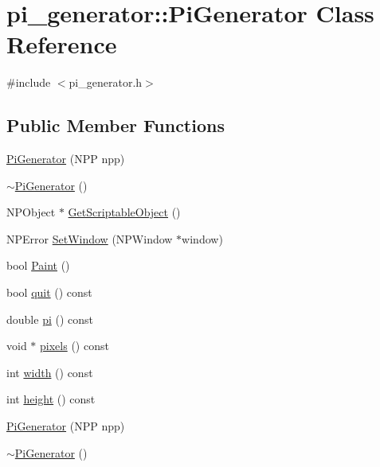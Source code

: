 \hypertarget{classpi__generator_1_1_pi_generator}{
\section{pi\_\-generator::PiGenerator Class Reference}
\label{classpi__generator_1_1_pi_generator}
}


{\ttfamily \#include $<$pi\_\-generator.h$>$}

\subsection*{Public Member Functions}
\begin{DoxyCompactItemize}
\item 
\hyperlink{classpi__generator_1_1_pi_generator_a0f5a55bbb942dee1b185447f0a7e24be}{PiGenerator} (NPP npp)
\item 
\hyperlink{classpi__generator_1_1_pi_generator_ac7d9c07492fd86678b8f66643e1e8c1e}{$\sim$PiGenerator} ()
\item 
NPObject $\ast$ \hyperlink{classpi__generator_1_1_pi_generator_ac65f31616ae3d223bdc01b91aea91762}{GetScriptableObject} ()
\item 
NPError \hyperlink{classpi__generator_1_1_pi_generator_ad19c9de44971a5c08ee8e26a45598f38}{SetWindow} (NPWindow $\ast$window)
\item 
bool \hyperlink{classpi__generator_1_1_pi_generator_a47540afa1d21ef0b6e6ea7d986b71243}{Paint} ()
\item 
bool \hyperlink{classpi__generator_1_1_pi_generator_a02e8796485d878cbe8a42dcc2b204c4a}{quit} () const 
\item 
double \hyperlink{classpi__generator_1_1_pi_generator_a74119d27c1a01b50b91677f8089a0103}{pi} () const 
\item 
void $\ast$ \hyperlink{classpi__generator_1_1_pi_generator_a3e4279bb7732861b21ab6d1dcfc27429}{pixels} () const 
\item 
int \hyperlink{classpi__generator_1_1_pi_generator_ae3b2d276f4cf6209d7653f6fc4437fc4}{width} () const 
\item 
int \hyperlink{classpi__generator_1_1_pi_generator_a7cdc6f6c02a01a63e813c8357e901fb9}{height} () const 
\item 
\hyperlink{classpi__generator_1_1_pi_generator_a0f5a55bbb942dee1b185447f0a7e24be}{PiGenerator} (NPP npp)
\item 
\hyperlink{classpi__generator_1_1_pi_generator_ac7d9c07492fd86678b8f66643e1e8c1e}{$\sim$PiGenerator} ()

\end{DoxyCompactItemize}
